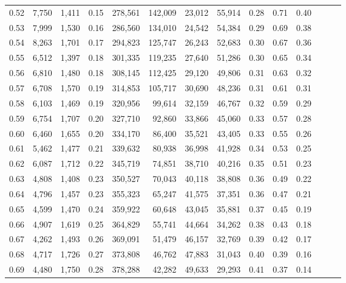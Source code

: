 \begin{tabular}{rrrrrrrrrrrrrr}
0.52 &   7,750 &  1,411 &  0.15 &  278,561 &  142,009 &  23,012 &  55,914 &  0.28 &  0.71 &      0.40 \\
0.53 &   7,999 &  1,530 &  0.16 &  286,560 &  134,010 &  24,542 &  54,384 &  0.29 &  0.69 &      0.38 \\
0.54 &   8,263 &  1,701 &  0.17 &  294,823 &  125,747 &  26,243 &  52,683 &  0.30 &  0.67 &      0.36 \\
0.55 &   6,512 &  1,397 &  0.18 &  301,335 &  119,235 &  27,640 &  51,286 &  0.30 &  0.65 &      0.34 \\
0.56 &   6,810 &  1,480 &  0.18 &  308,145 &  112,425 &  29,120 &  49,806 &  0.31 &  0.63 &      0.32 \\
0.57 &   6,708 &  1,570 &  0.19 &  314,853 &  105,717 &  30,690 &  48,236 &  0.31 &  0.61 &      0.31 \\
0.58 &   6,103 &  1,469 &  0.19 &  320,956 &   99,614 &  32,159 &  46,767 &  0.32 &  0.59 &      0.29 \\
0.59 &   6,754 &  1,707 &  0.20 &  327,710 &   92,860 &  33,866 &  45,060 &  0.33 &  0.57 &      0.28 \\
0.60 &   6,460 &  1,655 &  0.20 &  334,170 &   86,400 &  35,521 &  43,405 &  0.33 &  0.55 &      0.26 \\
0.61 &   5,462 &  1,477 &  0.21 &  339,632 &   80,938 &  36,998 &  41,928 &  0.34 &  0.53 &      0.25 \\
0.62 &   6,087 &  1,712 &  0.22 &  345,719 &   74,851 &  38,710 &  40,216 &  0.35 &  0.51 &      0.23 \\
0.63 &   4,808 &  1,408 &  0.23 &  350,527 &   70,043 &  40,118 &  38,808 &  0.36 &  0.49 &      0.22 \\
0.64 &   4,796 &  1,457 &  0.23 &  355,323 &   65,247 &  41,575 &  37,351 &  0.36 &  0.47 &      0.21 \\
0.65 &   4,599 &  1,470 &  0.24 &  359,922 &   60,648 &  43,045 &  35,881 &  0.37 &  0.45 &      0.19 \\
0.66 &   4,907 &  1,619 &  0.25 &  364,829 &   55,741 &  44,664 &  34,262 &  0.38 &  0.43 &      0.18 \\
0.67 &   4,262 &  1,493 &  0.26 &  369,091 &   51,479 &  46,157 &  32,769 &  0.39 &  0.42 &      0.17 \\
0.68 &   4,717 &  1,726 &  0.27 &  373,808 &   46,762 &  47,883 &  31,043 &  0.40 &  0.39 &      0.16 \\
0.69 &   4,480 &  1,750 &  0.28 &  378,288 &   42,282 &  49,633 &  29,293 &  0.41 &  0.37 &      0.14 \\

\end{tabular}
